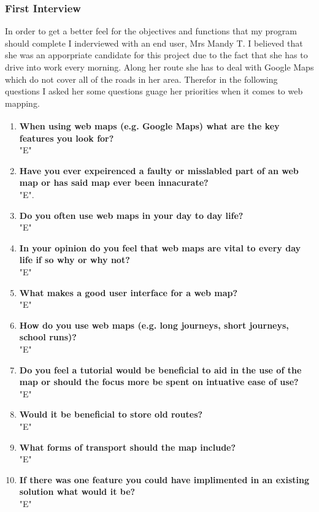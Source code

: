 \begin{flushleft}
            \subsubsection{First Interview}
            \large
            In order to get a better feel for the objectives and functions that my program should complete I inderviewed with an end user, Mrs Mandy T. I believed that she was an apporpriate candidate for this
            project due to the fact that she has to drive into work every morning. Along her route she has to deal with Google Maps which do not cover all of the roads in her area. Therefor in the following questions
            I asked her some questions guage her priorities when it comes to web mapping.
            \bk
            \begin{enumerate}
                \item {\bf{When using web maps (e.g. Google Maps\textsuperscript{\small \textcopyright}) what are the key features you look for?}} \\
                \bk
                "E"
                \item {\bf{Have you ever expeirenced a faulty or misslabled part of an web map or has said map ever been innacurate?}} \\
                \bk
                "E".
                \item {\bf{Do you often use web maps in your day to day life?}} \\
                \bk
                "E"
                \item {\bf{In your opinion do you feel that web maps are vital to every day life if so why or why not? }} \\
                \bk
                "E"
                \item {\bf{What makes a good user interface for a web map?}} \\
                \bk 
                "E"
                \item {\bf{How do you use web maps (e.g. long journeys, short journeys, school runs)?}} \\
                \bk
                "E"
                \item {\bf{Do you feel a tutorial would be beneficial to aid in the use of the map or should the focus more be spent on intuative ease of use?}} \\
                \bk
                "E"
                \item {\bf{Would it be beneficial to store old routes?}} \\
                \bk
                "E"
                \item {\bf{What forms of transport should the map include?}} \\
                \bk
                "E"
                \item {\bf{If there was one feature you could have implimented in an existing solution what would it be?}} \\
                \bk
                "E"
            \end{enumerate}
            

\end{flushleft}
